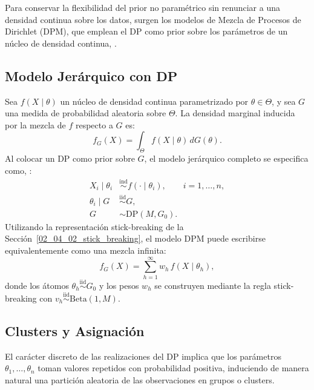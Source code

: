 Para conservar la flexibilidad del prior no paramétrico sin renunciar a una densidad continua sobre los datos, surgen los modelos de Mezcla de Procesos de Dirichlet (DPM), que emplean el DP como prior sobre los parámetros de un núcleo de densidad continua, \cite{02_04_muller2015bayesian}.

\subsection{Modelo Jerárquico con DP}
\label{02_05_01_dpm}
Sea $f(X \mid \theta)$ un núcleo de densidad continua parametrizado por $\theta \in \Theta$, y sea $G$ una medida de probabilidad aleatoria sobre $\Theta$. La densidad marginal inducida por la mezcla de $f$ respecto a $G$ es:
\begin{equation}
    f_G(X) = \int_\Theta f(X \mid \theta)\, dG(\theta).
\end{equation}
Al colocar un DP como prior sobre $G$, el modelo jerárquico completo se especifica como, \cite{02_04_muller2015bayesian}:
\begin{equation}
\begin{aligned}
    X_i \mid \theta_i &\overset{\mathrm{ind}}{\sim} f(\cdot \mid \theta_i),
    \qquad i = 1, \dots, n, \\
    \theta_i \mid G &\overset{\mathrm{iid}}{\sim} G, \\
    G &\sim \mathrm{DP}(M, G_0).
\end{aligned}
\end{equation}
Utilizando la representación stick-breaking de la Sección~\ref{02_04_02_stick_breaking}, el modelo DPM puede escribirse equivalentemente como una mezcla infinita:
\begin{equation}\label{eq:dpm_sb}
    f_G(X) = \sum_{h=1}^{\infty} w_h\, f(X \mid \theta_h),
\end{equation}
donde los átomos $\theta_h \overset{\mathrm{iid}}{\sim} G_0$ y los pesos $w_h$ se construyen mediante la regla stick-breaking con $v_h \overset{\mathrm{iid}}{\sim} \mathrm{Beta}(1, M)$.

\subsection{Clusters y Asignación}
\label{02_05_02_clusters}
El carácter discreto de las realizaciones del DP implica que los parámetros $\theta_1, \dots, \theta_n$ toman valores repetidos con probabilidad positiva, induciendo de manera natural una partición aleatoria de las observaciones en grupos o clusters.\\

